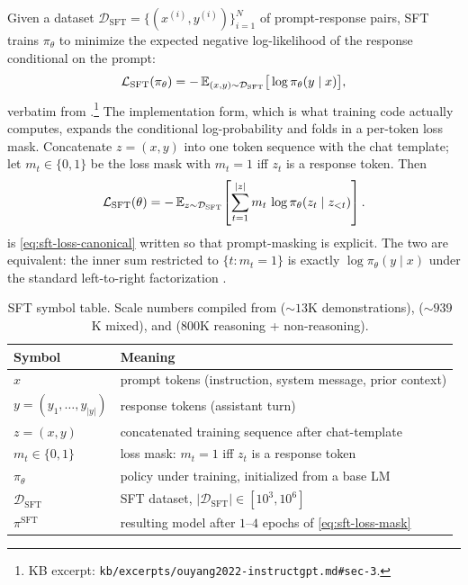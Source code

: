 Given a dataset $\mathcal{D}_{\mathrm{SFT}} = \{(x^{(i)}, y^{(i)})\}_{i=1}^N$
of prompt-response pairs, SFT trains $\pi_\theta$ to minimize the
expected negative log-likelihood of the response conditional on the
prompt:
\begin{equation}
\mathcal{L}_{\mathrm{SFT}}(\pi_\theta)
  = -\operatorname{\mathbb{E}}_{(x,y)\sim\mathcal{D}_{\mathrm{SFT}}}
       \!\big[\log \pi_\theta(y \mid x)\big],
\label{eq:sft-loss-canonical}
\end{equation}
verbatim from \citet[\S 3]{ouyang2022-instructgpt}.\footnote{KB excerpt:
\nolinkurl{kb/excerpts/ouyang2022-instructgpt.md#sec-3}.} The
implementation form, which is what training code actually computes,
expands the conditional log-probability and folds in a per-token loss
mask. Concatenate $z = (x, y)$ into one token sequence with the chat
template; let $m_t \in \{0, 1\}$ be the loss mask with $m_t = 1$ iff
$z_t$ is a response token. Then
\begin{equation}
\mathcal{L}_{\mathrm{SFT}}(\theta)
  = -\operatorname{\mathbb{E}}_{z \sim \mathcal{D}_{\mathrm{SFT}}}
       \!\left[\sum_{t=1}^{|z|} m_t \, \log \pi_\theta(z_t \mid z_{<t})\right].
\label{eq:sft-loss-mask}
\end{equation}
 is \cref{eq:sft-loss-canonical} written so that
prompt-masking is explicit. The two are equivalent: the inner sum
restricted to $\{t : m_t = 1\}$ is exactly $\log \pi_\theta(y \mid x)$
under the standard left-to-right factorization
\citep[\S 3.5]{ouyang2022-instructgpt}.

\begin{table}[h]
\centering
\small
\begin{tabular}{ll}
\toprule
Symbol & Meaning \\
\midrule
$x$ & prompt tokens (instruction, system message, prior context) \\
$y = (y_1, \ldots, y_{|y|})$ & response tokens (assistant turn) \\
$z = (x, y)$ & concatenated training sequence after chat-template \\
$m_t \in \{0, 1\}$ & loss mask: $m_t = 1$ iff $z_t$ is a response token \\
$\pi_\theta$ & policy under training, initialized from a base LM \\
$\mathcal{D}_{\mathrm{SFT}}$ & SFT dataset, $|\mathcal{D}_{\mathrm{SFT}}| \in [10^3, 10^6]$ \\
$\pi^{\mathrm{SFT}}$ & resulting model after $1$--$4$ epochs of \cref{eq:sft-loss-mask} \\
\bottomrule
\end{tabular}
\caption{SFT symbol table. Scale numbers compiled from
\citet[\S 3.4]{ouyang2022-instructgpt} ($\sim\!13$K demonstrations),
\citet{tulu3} ($\sim\!939$K mixed), and \citet[\S 4]{deepseek-r1}
($800$K reasoning + non-reasoning).}
\label{tab:sft-symbols}
\end{table}

